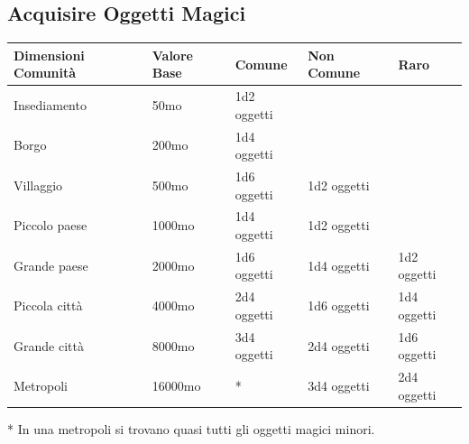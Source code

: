 \subsection{Acquisire Oggetti Magici}

\label{acquisire-oggetti-magici}

\bigskip

\begin{tabular}{lllll}
	\textbf{Dimensioni Comunità} & \textbf{Valore Base} & \textbf{Comune} & \textbf{Non Comune} & \textbf{Raro}\\
	\toprule
	Insediamento  & 50mo & 1d2 oggetti     && \\
	Borgo         & 200mo& 1d4 oggetti     && \\
	Villaggio     & 500mo& 1d6 oggetti     & 1d2 oggetti    & \\
	Piccolo paese & 1000mo               & 1d4 oggetti     & 1d2 oggetti    & \\
	Grande paese  & 2000mo               & 1d6 oggetti     & 1d4 oggetti    & 1d2 oggetti\\
	Piccola città & 4000mo               & 2d4 oggetti     & 1d6 oggetti    & 1d4 oggetti\\
	Grande città  & 8000mo               & 3d4 oggetti      & 2d4 oggetti    & 1d6 oggetti\\
	Metropoli     & 16000mo              & {*}             & 3d4 oggetti    & 2d4 oggetti\\
\end{tabular}

{*} In una metropoli si trovano quasi tutti gli oggetti magici minori.

